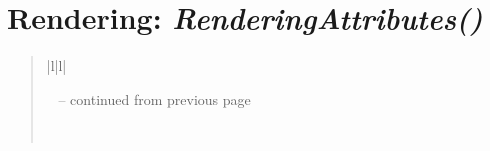 \documentclass[letterpaper,10pt,english]{sphinxmanual}
\begin{document}
\section{\textbf{Rendering}: \emph{RenderingAttributes()}}
\label{attributes:rendering-renderingattributes}
\begin{DUlineblock}{0em}
\item[] 
\end{DUlineblock}
\begin{quote}

\begin{longtable}{|l|l|}
\hline
\endfirsthead

%
{{\textsf{\tablename\ \thetable{} -- continued from previous page}}} \\
\hline
\endhead

\hline {} \\ \hline
\endfoot

\endlastfoot



\end{longtable}
\end{quote}
\end{document}
